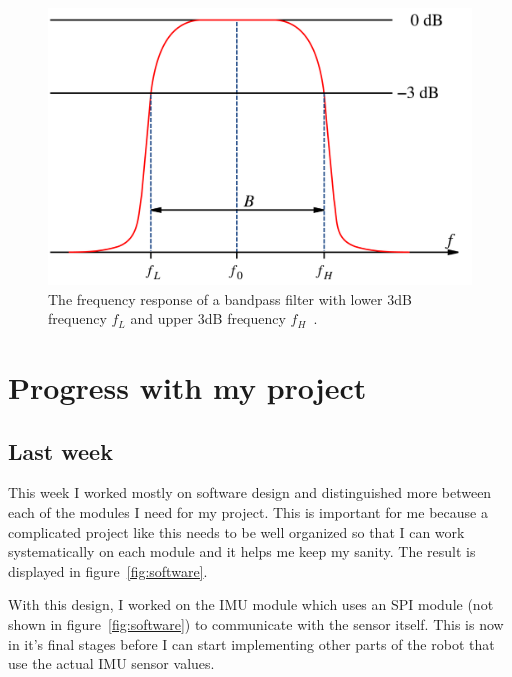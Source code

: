 \documentclass[11pt,a4paper,titlepage]{article}
\begin{document}
	\begin{figure}[h]
		\centering
		\includegraphics[width=\textwidth]{graphics/bandpassbode}
		\caption{The frequency response of a bandpass filter with lower 3dB frequency $f_L$ and upper 3dB frequency $f_H$~\cite{bandpass}.}
		\label{fig:bandpass}
	\end{figure}
	
	
	
	
	
	
	
	
	
	
	
	
	
	
	\pagebreak
	\section{Progress with my project}
	
	\subsection{Last week}
	This week I worked mostly on software design and distinguished more between each of the modules I need for my project. This is important for me because a complicated project like this needs to be well organized so that I can work systematically on each module and it helps me keep my sanity. The result is displayed in figure~\ref{fig:software}.
	
	With this design, I worked on the IMU module which uses an SPI module (not shown in figure~\ref{fig:software}) to communicate with the sensor itself. This is now in it's final stages before I can start implementing other parts of the robot that use the actual IMU sensor values.
	
\end{document}
